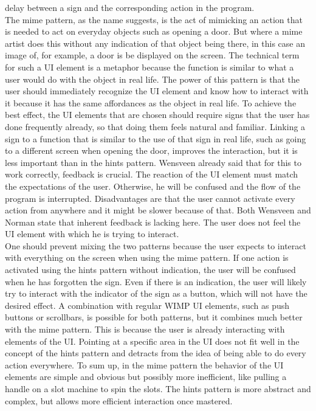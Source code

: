 delay between a sign and the corresponding action in the program.\\

The mime pattern, as the name suggests, is the act of mimicking an action that is needed to act on everyday objects such as opening a door. But where a mime artist does this without any indication of that object being there, in this case an image of, for example, a door is be displayed on the screen. The technical term for such a UI element is a metaphor because the function is similar to what a user would do with the object in real life. The power of this pattern is that the user should immediately recognize the UI element and know how to interact with it because it has the same affordances as the object in real life. To achieve the best effect, the UI elements that are chosen should require signs that the user has done frequently already, so that doing them feels natural and familiar. Linking a sign to a function that is similar to the use of that sign in real life, such as going to a different screen when opening the door, improves the interaction, but it is less important than in the hints pattern. Wensveen \cite{Wensveen2004} already said that for this to work correctly, feedback is crucial. The reaction of the UI element must match the expectations of the user. Otherwise, he will be confused and the flow of the program is interrupted. Disadvantages are that the user cannot activate every action from anywhere and it might be slower because of that. Both Wensveen \cite{Wensveen2004} and Norman \cite{Norman2010} state that inherent feedback is lacking here. The user does not feel the UI element with which he is trying to interact.\\

One should prevent mixing the two patterns because the user expects to interact with everything on the screen when using the mime pattern. If one action is activated using the hints pattern without indication, the user will be confused when he has forgotten the sign. Even if there is an indication, the user will likely try to interact with the indicator of the sign as a button, which will not have the desired effect. A combination with regular WIMP UI elements, such as push buttons or scrollbars, is possible for both patterns, but it combines much better with the mime pattern. This is because the user is already interacting with elements of the UI. Pointing at a specific area in the UI does not fit well in the concept of the hints pattern and detracts from the idea of being able to do every action everywhere. To sum up, in the mime pattern the behavior of the UI elements are simple and obvious but possibly more inefficient, like pulling a handle on a slot machine to spin the slots. The hints pattern is more abstract and complex, but allows more efficient interaction once mastered.


